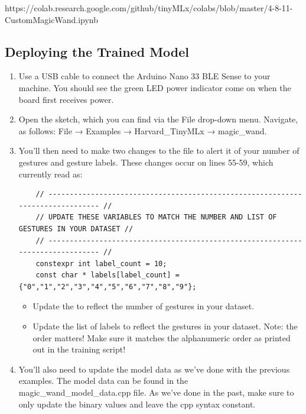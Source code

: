     https://colab.research.google.com/github/tinyMLx/colabs/blob/master/4-8-11-CustomMagicWand.ipynb
    
\subsection{Deploying the Trained Model}

\begin{enumerate}
  \item Use a USB cable to connect the Arduino Nano 33 BLE Sense to your machine. You should see the green LED power indicator come on when the board first receives power.
  
  \item Open the sketch, which you can find via the File drop-down menu. Navigate, as follows: File → Examples → Harvard\_TinyMLx → magic\_wand.
  
  \item You’ll then need to make two changes to the  file to alert it of your number of gestures and gesture labels. These changes occur on lines 55-59, which currently read as:
  
  \begin{lstlisting}
    // ------------------------------------------------------------------------------- //
    // UPDATE THESE VARIABLES TO MATCH THE NUMBER AND LIST OF GESTURES IN YOUR DATASET //
    // ------------------------------------------------------------------------------- //
    constexpr int label_count = 10;
    const char * labels[label_count] = {"0","1","2","3","4","5","6","7","8","9"};
  \end{lstlisting}  

  \begin{itemize}
      \item Update the  to reflect the number of gestures in your dataset.
      \item Update the list of labels to reflect the gestures in your dataset. Note: the order matters! Make sure it matches the alphanumeric order as printed out in the training script!
  \end{itemize}    
      
 \item You'll also need to update the model data as we've done with the previous examples. The model data can be found in the magic\_wand\_model\_data.cpp file. As we've done in the past, make sure to only update the binary values and leave the cpp syntax constant.
 

\end{enumerate}

